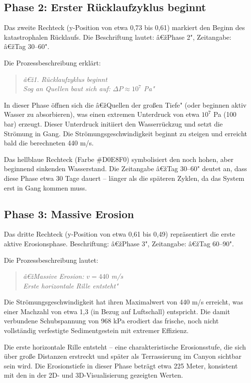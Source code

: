 ﻿\documentclass[12pt,a4paper]{report}
\begin{document}
\subsection{Phase 2: Erster Rücklaufzyklus beginnt}

Das zweite Rechteck (y-Position von etwa 0,73 bis 0,61) markiert den Beginn des katastrophalen Rücklaufs. Die Beschriftung lautet: â€žPhase 2", Zeitangabe: â€žTag 30--60".

Die Prozessbeschreibung erklärt:
\begin{quote}
	\textit{â€ž1. Rücklaufzyklus beginnt\\
		Sog an Quellen baut sich auf: $\Delta P \approx 10^7$ Pa"}
\end{quote}

In dieser Phase öffnen sich die â€žQuellen der großen Tiefe" (oder beginnen aktiv Wasser zu absorbieren), was einen extremen Unterdruck von etwa $10^7$ Pa (100 bar) erzeugt. Dieser Unterdruck initiiert den Wasserrückzug und setzt die Strömung in Gang. Die Strömungsgeschwindigkeit beginnt zu steigen und erreicht bald die berechneten 440 m/s.

Das hellblaue Rechteck (Farbe \#D0E8F0) symbolisiert den noch hohen, aber beginnend sinkenden Wasserstand. Die Zeitangabe â€žTag 30--60" deutet an, dass diese Phase etwa 30 Tage dauert -- länger als die späteren Zyklen, da das System erst in Gang kommen muss.

\subsection{Phase 3: Massive Erosion}

Das dritte Rechteck (y-Position von etwa 0,61 bis 0,49) repräsentiert die erste aktive Erosionsphase. Beschriftung: â€žPhase 3", Zeitangabe: â€žTag 60--90".

Die Prozessbeschreibung lautet:
\begin{quote}
	\textit{â€žMassive Erosion: $v = 440$ m/s\\
		Erste horizontale Rille entsteht"}
\end{quote}

Die Strömungsgeschwindigkeit hat ihren Maximalwert von 440 m/s erreicht, was einer Machzahl von etwa 1,3 (in Bezug auf Luftschall) entspricht. Die damit verbundene Schubspannung von 968 kPa erodiert das frische, noch nicht vollständig verfestigte Sedimentgestein mit extremer Effizienz.

Die erste horizontale Rille entsteht -- eine charakteristische Erosionsstufe, die sich über große Distanzen erstreckt und später als Terrassierung im Canyon sichtbar sein wird. Die Erosionstiefe in dieser Phase beträgt etwa 225 Meter, konsistent mit den in der 2D- und 3D-Visualisierung gezeigten Werten.
\end{document}
